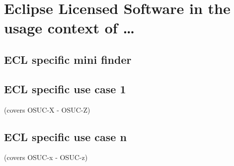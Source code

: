 %
%
%
%
%



\section{Eclipse Licensed Software in the usage context of \ldots}
\label{OSUC-01-ECL} \label{OSUC-03-ECL} 
\label{OSUC-06-ECL} \label{OSUC-09-ECL}

\label{OSUC-02-ECL} \label{OSUC-04-ECL} \label{OSUC-05-ECL}
\label{OSUC-07-ECL} \label{OSUC-08-ECL} \label{OSUC-10-ECL}

\subsection{ECL specific mini finder}

\subsection{ECL specific use case 1}
(covers OSUC-X - OSUC-Z)

\subsection{ECL specific use case n}
(covers OSUC-x - OSUC-z)


%
